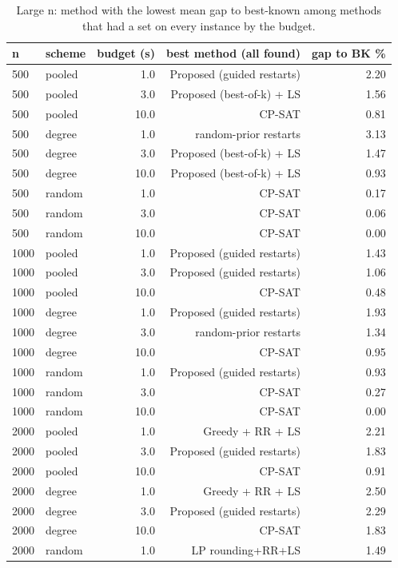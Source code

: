 \begin{table}[t]
\centering
\caption{Large n: method with the lowest mean gap to best-known among methods that had a set on every instance by the budget.}
\label{tab:rev2_step2_best}
\scriptsize
\begin{tabular}{llrrr}
\toprule
n & scheme & budget (s) & best method (all found) & gap to BK \% \\
\midrule
500 & pooled & 1.0 & Proposed (guided restarts) & 2.20 \\
500 & pooled & 3.0 & Proposed (best-of-k) + LS & 1.56 \\
500 & pooled & 10.0 & CP-SAT & 0.81 \\
500 & degree & 1.0 & random-prior restarts & 3.13 \\
500 & degree & 3.0 & Proposed (best-of-k) + LS & 1.47 \\
500 & degree & 10.0 & Proposed (best-of-k) + LS & 0.93 \\
500 & random & 1.0 & CP-SAT & 0.17 \\
500 & random & 3.0 & CP-SAT & 0.06 \\
500 & random & 10.0 & CP-SAT & 0.00 \\
1000 & pooled & 1.0 & Proposed (guided restarts) & 1.43 \\
1000 & pooled & 3.0 & Proposed (guided restarts) & 1.06 \\
1000 & pooled & 10.0 & CP-SAT & 0.48 \\
1000 & degree & 1.0 & Proposed (guided restarts) & 1.93 \\
1000 & degree & 3.0 & random-prior restarts & 1.34 \\
1000 & degree & 10.0 & CP-SAT & 0.95 \\
1000 & random & 1.0 & Proposed (guided restarts) & 0.93 \\
1000 & random & 3.0 & CP-SAT & 0.27 \\
1000 & random & 10.0 & CP-SAT & 0.00 \\
2000 & pooled & 1.0 & Greedy + RR + LS & 2.21 \\
2000 & pooled & 3.0 & Proposed (guided restarts) & 1.83 \\
2000 & pooled & 10.0 & CP-SAT & 0.91 \\
2000 & degree & 1.0 & Greedy + RR + LS & 2.50 \\
2000 & degree & 3.0 & Proposed (guided restarts) & 2.29 \\
2000 & degree & 10.0 & CP-SAT & 1.83 \\
2000 & random & 1.0 & LP rounding+RR+LS & 1.49 \\

\end{tabular}
\end{table}
